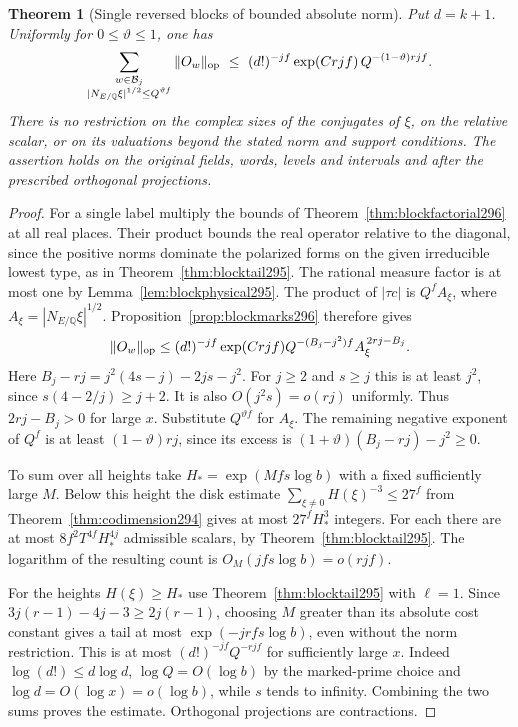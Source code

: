 \documentclass[a4paper,11pt]{article}
\newtheorem{theorem}[proposition]{Theorem}
\theoremstyle{definition}
\theoremstyle{remark}
\numberwithin{equation}{section}
\begin{document}
\begin{theorem}[Single reversed blocks of bounded absolute norm]\leavevmode
\label{thm:blocknorm296}
Put \(d=k+1\). Uniformly for \(0\le\vartheta\le1\), one has
\[
  \sum_{\substack{w\in\mathcal B_j\\
           |N_{E/\mathbb Q}\xi|^{1/2}\le Q^{\vartheta f}}}
      \|O_w\|_{\rm op}
   \ \le\ (d!)^{-jf}\exp(Crjf)\,Q^{-(1-\vartheta)rjf}.
\]
There is no restriction on the complex sizes of the conjugates
of \(\xi\), on the relative scalar, or on its valuations beyond
the stated norm and support conditions. The assertion holds on
the original fields, words, levels and intervals and after the
prescribed orthogonal projections.
\end{theorem}
\begin{proof}
For a single label multiply the bounds of
Theorem~\ref{thm:blockfactorial296} at all real places.
Their product bounds the real operator relative to the
diagonal, since the positive norms dominate the polarized
forms on the given irreducible lowest type, as in
Theorem~\ref{thm:blocktail295}. The rational measure factor is
at most one by Lemma~\ref{lem:blockphysical295}.
The product of \(|\tau c|\) is \(Q^f A_\xi\), where
\(A_\xi=|N_{E/\mathbb Q}\xi|^{1/2}\).
Proposition~\ref{prop:blockmarks296} therefore gives
\[
  \|O_w\|_{\rm op}
   \le (d!)^{-jf}\exp(Crjf)
                Q^{-(B_j-j^2)f} A_\xi^{\,2rj-B_j}.
\]
Here \(B_j-rj=j^2(4s-j)-2js-j^2\). For \(j\ge2\) and
\(s\ge j\) this is at least \(j^2\), since
\(s(4-2/j)\ge j+2\). It is also \(O(j^2s)=o(rj)\)
uniformly. Thus \(2rj-B_j>0\) for large \(x\).
Substitute \(Q^{\vartheta f}\) for \(A_\xi\). The remaining
negative exponent of \(Q^f\) is at least
\((1-\vartheta)rj\), since its excess is
\((1+\vartheta)(B_j-rj)-j^2\ge0\).

To sum over all heights take \(H_*=\exp(Mfs\log b)\) with
a fixed sufficiently large \(M\). Below this height the disk
estimate \(\sum_{\xi\ne0}H(\xi)^{-3}\le27^f\) from
Theorem~\ref{thm:codimension294} gives at most
\(27^f H_*^3\) integers. For each there are at most
\(8f^2T^{4f}H_*^{4j}\) admissible scalars, by
Theorem~\ref{thm:blocktail295}. The logarithm of the resulting
count is \(O_M(jfs\log b)=o(rjf)\).

For the heights \(H(\xi)\ge H_*\) use
Theorem~\ref{thm:blocktail295} with \(\ell=1\).
Since \(3j(r-1)-4j-3\ge 2j(r-1)\), choosing \(M\)
greater than its absolute cost constant gives a tail at most
\(\exp(-jrfs\log b)\), even without the norm restriction.
This is at most \((d!)^{-jf}Q^{-rjf}\) for sufficiently
large \(x\). Indeed \(\log(d!)\le d\log d\),
\(\log Q=O(\log b)\) by the marked-prime choice and
\(\log d=O(\log x)=o(\log b)\), while \(s\) tends to
infinity. Combining the two sums proves the estimate.
Orthogonal projections are contractions.
\end{proof}
\end{document}

